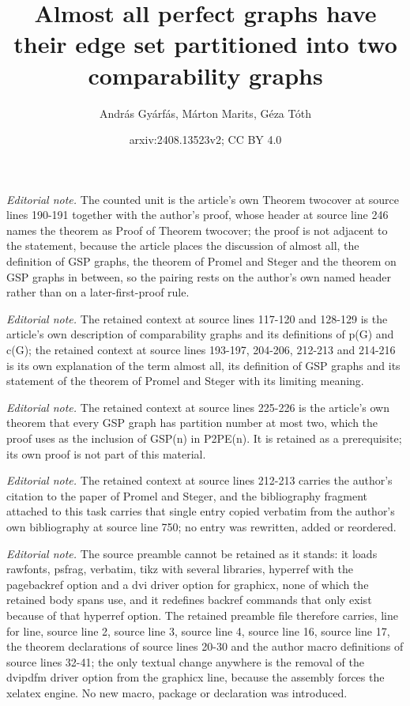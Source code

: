 \documentclass[12pt]{article}
\title{Almost all perfect graphs have their edge set partitioned into two comparability graphs}
\author{András Gyárfás, Márton Marits, Géza Tóth}
\date{arxiv:2408.13523v2; CC BY 4.0}
\begin{document}
\maketitle
\noindent\textit{Editorial note.} The counted unit is the article's own Theorem twocover at source lines 190-191 together with the author's proof, whose header at source line 246 names the theorem as Proof of Theorem twocover; the proof is not adjacent to the statement, because the article places the discussion of almost all, the definition of GSP graphs, the theorem of Promel and Steger and the theorem on GSP graphs in between, so the pairing rests on the author's own named header rather than on a later-first-proof rule.\par\medskip
\noindent\textit{Editorial note.} The retained context at source lines 117-120 and 128-129 is the article's own description of comparability graphs and its definitions of p(G) and c(G); the retained context at source lines 193-197, 204-206, 212-213 and 214-216 is its own explanation of the term almost all, its definition of GSP graphs and its statement of the theorem of Promel and Steger with its limiting meaning.\par\medskip
\noindent\textit{Editorial note.} The retained context at source lines 225-226 is the article's own theorem that every GSP graph has partition number at most two, which the proof uses as the inclusion of GSP(n) in P2PE(n). It is retained as a prerequisite; its own proof is not part of this material.\par\medskip
\noindent\textit{Editorial note.} The retained context at source lines 212-213 carries the author's citation to the paper of Promel and Steger, and the bibliography fragment attached to this task carries that single entry copied verbatim from the author's own bibliography at source line 750; no entry was rewritten, added or reordered.\par\medskip
\noindent\textit{Editorial note.} The source preamble cannot be retained as it stands: it loads rawfonts, psfrag, verbatim, tikz with several libraries, hyperref with the pagebackref option and a dvi driver option for graphicx, none of which the retained body spans use, and it redefines backref commands that only exist because of that hyperref option. The retained preamble file therefore carries, line for line, source line 2, source line 3, source line 4, source line 16, source line 17, the theorem declarations of source lines 20-30 and the author macro definitions of source lines 32-41; the only textual change anywhere is the removal of the dvipdfm driver option from the graphicx line, because the assembly forces the xelatex engine. No new macro, package or declaration was introduced.\par\medskip
\end{document}
